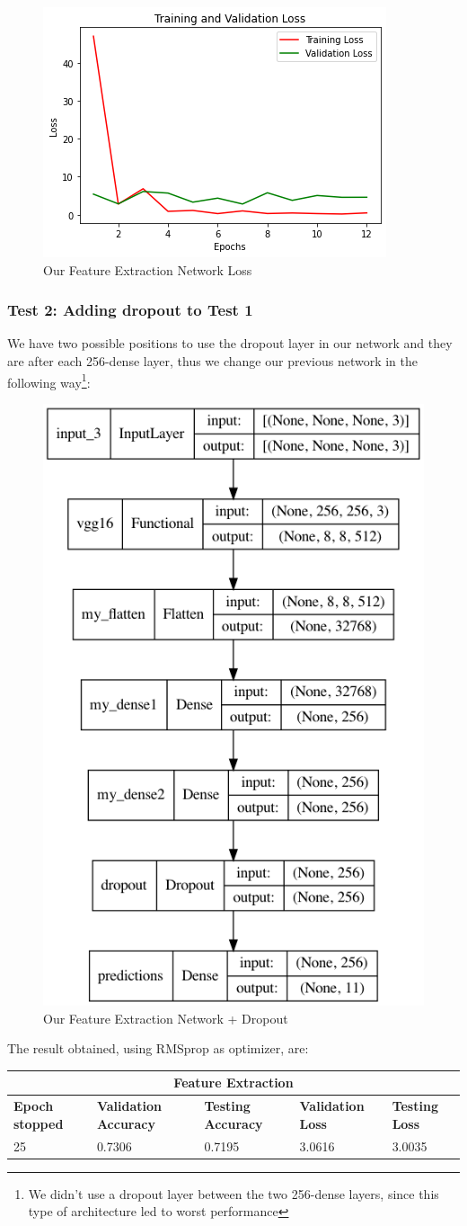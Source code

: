 \begin{figure}[H]
	\centering
	\includegraphics[height=0.45\textwidth]{img/vgg16/vgg16fe1loss.png}
	\caption{Our Feature Extraction Network Loss}
	\label{fig:vgg16fe1loss}
\end{figure}

\subsubsection{Test 2: Adding dropout to Test 1}
We have two possible positions to use the dropout layer in our network and they are after each 256-dense layer, thus we change our previous network in the following way\footnote{We didn't use a dropout layer between the two 256-dense layers, since this type of architecture led to worst performance}:
\begin{figure}[H]
	\centering
	\includegraphics[height=0.45\textwidth]{img/vgg16/vgg16fe2.png}
	\caption{Our Feature Extraction Network + Dropout}
	\label{fig:vgg16fe2}
\end{figure}
  

\noindent The result obtained, using RMSprop as optimizer, are:

\medskip

\begin{tabular}{ |p{2cm}|p{2cm}|p{2cm}|p{2cm}|p{2cm}|  }
\hline
\multicolumn{5}{|c|}{Feature Extraction} \\
\hline
\textbf{Epoch stopped} & \textbf{Validation Accuracy} & \textbf{Testing Accuracy} & \textbf{Validation Loss} & \textbf{Testing Loss} \\
\hline
25 & 0.7306 & 0.7195 & 3.0616 & 3.0035\\
\hline
\end{tabular}

